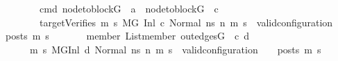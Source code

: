 \begin{isabellebody}
\ \ \ \ \ \ \ cmd{\isacharcolon}{\kern0pt}\ {\isachardoublequoteopen}node{\isacharunderscore}{\kern0pt}to{\isacharunderscore}{\kern0pt}block{\isacharparenleft}{\kern0pt}G{\isacharparenright}{\kern0pt}\ {\isacharbang}{\kern0pt}\ a\ {\isacharequal}{\kern0pt}\ node{\isacharunderscore}{\kern0pt}to{\isacharunderscore}{\kern0pt}block{\isacharparenleft}{\kern0pt}G{\isacharprime}{\kern0pt}{\isacharparenright}{\kern0pt}\ {\isacharbang}{\kern0pt}\ c{\isachardoublequoteclose}\isanewline
\ \ \ \ \ \ \ targetVerifies{\isacharcolon}{\kern0pt}\ {\isachardoublequoteopen}{\isacharparenleft}{\kern0pt}{\isasymforall}m{}{\isacharprime}{\kern0pt}\ s{}{\isacharprime}{\kern0pt}{\isachardot}{\kern0pt}\ {\isacharparenleft}{\kern0pt}M{\isacharcomma}{\kern0pt}{\isasymLambda}{\isacharcomma}{\kern0pt}{\isasymGamma}{\isacharcomma}{\kern0pt}{\isasymOmega}{\isacharcomma}{\kern0pt}G{\isacharprime}{\kern0pt}\ {\isasymturnstile}{\isacharparenleft}{\kern0pt}Inl\ c{\isacharcomma}{\kern0pt}\ Normal\ ns{\isacharparenright}{\kern0pt}\ {\isacharminus}{\kern0pt}n{\isasymrightarrow}{\isacharasterisk}{\kern0pt}\ {\isacharparenleft}{\kern0pt}m{}{\isacharprime}{\kern0pt}{\isacharcomma}{\kern0pt}\ s{}{\isacharprime}{\kern0pt}{\isacharparenright}{\kern0pt}{\isacharparenright}{\kern0pt}\ {\isasymlongrightarrow}\ valid{\isacharunderscore}{\kern0pt}configuration\ {\isasymLambda}\ {\isasymGamma}\ {\isasymOmega}\ posts\ m{}{\isacharprime}{\kern0pt}\ s{}{\isacharprime}{\kern0pt}{\isacharparenright}{\kern0pt}{\isachardoublequoteclose}\isanewline
\ \ \ \ \ \ \ member{\isacharcolon}{\kern0pt}\ {\isachardoublequoteopen}List{\isachardot}{\kern0pt}member\ {\isacharparenleft}{\kern0pt}out{\isacharunderscore}{\kern0pt}edges{\isacharparenleft}{\kern0pt}G{\isacharprime}{\kern0pt}{\isacharparenright}{\kern0pt}\ {\isacharbang}{\kern0pt}\ c{\isacharparenright}{\kern0pt}\ d{\isachardoublequoteclose}\isanewline
\ \ \ \ \ {\isachardoublequoteopen}{\isasymforall}m{}{\isacharprime}{\kern0pt}\ s{}{\isacharprime}{\kern0pt}{\isachardot}{\kern0pt}\ {\isacharparenleft}{\kern0pt}M{\isacharcomma}{\kern0pt}{\isasymLambda}{\isacharcomma}{\kern0pt}{\isasymGamma}{\isacharcomma}{\kern0pt}{\isasymOmega}{\isacharcomma}{\kern0pt}G{\isacharprime}{\kern0pt}{\isasymturnstile}{\isacharparenleft}{\kern0pt}Inl\ d{\isacharcomma}{\kern0pt}\ Normal\ ns{\isacharprime}{\kern0pt}{\isacharparenright}{\kern0pt}\ {\isacharminus}{\kern0pt}n{\isasymrightarrow}{\isacharasterisk}{\kern0pt}\ {\isacharparenleft}{\kern0pt}m{}{\isacharprime}{\kern0pt}{\isacharcomma}{\kern0pt}\ s{}{\isacharprime}{\kern0pt}{\isacharparenright}{\kern0pt}{\isacharparenright}{\kern0pt}\ {\isasymlongrightarrow}\ valid{\isacharunderscore}{\kern0pt}configuration\ {\isasymLambda}\ {\isasymGamma}\ {\isasymOmega}\ posts\ m{}{\isacharprime}{\kern0pt}\ s{}{\isacharprime}{\kern0pt}{\isachardoublequoteclose}\isanewline

\end{isabellebody}
